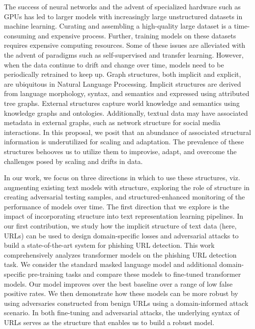 
The success of neural networks and the advent of specialized hardware such as GPUs has led to larger models with increasingly large unstructured datasets in machine learning.
Curating and assembling a high-quality large dataset is a time-consuming and expensive process.
Further, training models on these datasets requires expensive computing resources.
Some of these issues are alleviated with the advent of paradigms such as self-supervised and transfer learning.
However, when the data continue to drift and change over time,
models need to be periodically retrained to keep up.
Graph structures, both implicit and explicit, are ubiquitous in Natural Language Processing.
Implicit structures are derived from language morphology, syntax, and semantics and expressed using attributed tree graphs.
External structures capture world knowledge and semantics using knowledge graphs and ontologies.
Additionally, textual data may have associated metadata in external graphs, such as network structure for social media interactions.
In this proposal, we posit that an abundance of associated structural information is underutilized for scaling and adaptation.
The prevalence of these structures behooves us to utilize them to improvise, adapt, and overcome the challenges posed by scaling and drifts in data.

In our work, we focus on three directions in which to use these structures, viz. augmenting existing text models with structure, exploring the role of structure in creating adversarial testing samples, and structured-enhanced monitoring of the performance of models over time.
The first direction that we explore is the impact of incorporating structure into text representation learning pipelines.
In our first contribution, we study how the implicit structure of text data (here, URLs) can be used to design domain-specific losses and adversarial attacks to build a state-of-the-art system for phishing URL detection.
This work comprehensively analyzes transformer models on the phishing URL detection task.
We consider the standard masked language model and additional domain-specific pre-training tasks and compare these models to fine-tuned transformer models.
Our model improves over the best baseline over a range of low false positive rates.
We then demonstrate how these models can be more robust by using adversaries constructed from benign URLs using a domain-informed attack scenario. 
In both fine-tuning and adversarial attacks, the underlying syntax of URLs serves as the structure that enables us to build a robust model.


